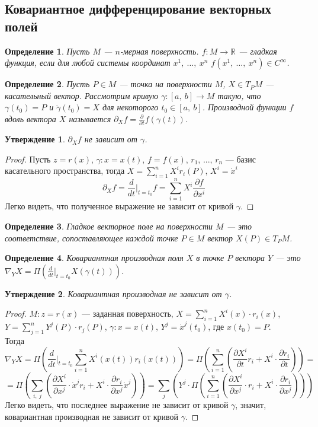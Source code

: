 \documentclass[12pt]{article}
\theoremstyle{plain}
\newtheorem{subtheorem}{Утверждение}[section]
\newtheorem{definition}{Определение}[section]
\newcommand{\R}{\mathbb R}
\begin{document}
    \subsection{Ковариантное дифференцирование векторных полей}
    \begin{definition}
        Пусть $M$ --- $n$-мерная поверхность. $f:M\to\R$ --- гладкая функция, если для любой системы координат $x^1, \ \ldots, \ x^n$ $f(x^1, \ \ldots, \ x^n)\in C^{\infty}$.
    \end{definition}
    \begin{definition}
        Пусть $P\in M$ --- точка на поверхности $M$, $X\in T_PM$ --- касательный вектор. Рассмотрим кривую $\gamma:[a, \ b]\to M$ такую, что $\gamma(t_0)=P$ и $\dot{\gamma}(t_0)=X$ для некоторого $t_0\in[a, \ b]$. Производной функции $f$ вдоль вектора $X$ называется $\partial_Xf=\frac{\partial}{\partial t}f(\gamma(t))$.
    \end{definition}
    \begin{subtheorem}
        $\partial_Xf$ не зависит от $\gamma$.
    \end{subtheorem}
    \begin{proof}
        Пусть $z=r(x)$, $\gamma: x=x(t)$, $f=f(x)$, $r_1$, ..., $r_n$ --- базис касательного пространства, тогда $X=\sum\limits_{i=1}^nX^ir_i(P)$, $X^i=\dot{x}^i$
        $$\partial_Xf=\frac{d}{dt}\vert_{t=t_0}f=\sum\limits_{i=1}^{n}X^i\frac{\partial f}{\partial x^i}$$
        Легко видеть, что полученное выражение не зависит от кривой $\gamma$.
    \end{proof}
    \begin{definition}
        Гладкое векторное поле на поверхности $M$ --- это соответствие, сопоставляющее каждой точке $P\in M$ вектор $X(P)\in T_PM$.
    \end{definition}
    \begin{definition}
        Ковариантная производная поля $X$ в точке $P$ вектора $Y$ --- это $\nabla_YX=\Pi\left(\frac{d}{d t}\vert_{t=t_0}X(\gamma(t))\right)$.
    \end{definition}
    \begin{subtheorem}
        Ковариантная производная не зависит от $\gamma$.
    \end{subtheorem}
    \begin{proof}
        $M:z=r(x)$ --- заданная поверхность, $X=\sum\limits_{i=1}^nX^i(x)\cdot r_i(x)$, $Y=\sum\limits_{j=1}^nY^j(P)\cdot r_j(P)$, $\gamma:x=x(t)$, $Y^j=\dot{x}^j(t_0)$, где $x(t_0)=P$.\\
        Тогда $$\nabla_YX=\Pi\left(\frac{d}{dt}\vert_{t=t_0}\sum\limits_{i=1}^nX^i(x(t))r_i(x(t))\right)=\Pi\left(\sum\limits_{i=1}^n\left(\frac{\partial X^i}{\partial t}r_i+X^i\cdot\frac{\partial r_i}{\partial t}\right)\right)=$$
        $$=\Pi\left(\sum\limits_{i, \ j}\left(\frac{\partial X^i}{\partial x^j}\cdot\dot{x}^jr_i+X^i\cdot\frac{\partial r_i}{\partial x^j}\dot{x}^j\right)\right)=\sum\limits_j\left(Y^j\cdot\Pi\left(\sum\limits_{i=1}^n\left(\frac{\partial X^i}{\partial x^j}\cdot r_i+X^i\cdot\frac{\partial r_i}{\partial x^j}\right)\right)\right)$$
        Легко видеть, что последнее выражение не зависит от кривой $\gamma$, значит, ковариантная производная не зависит от кривой $\gamma$.
    \end{proof}
\end{document}
